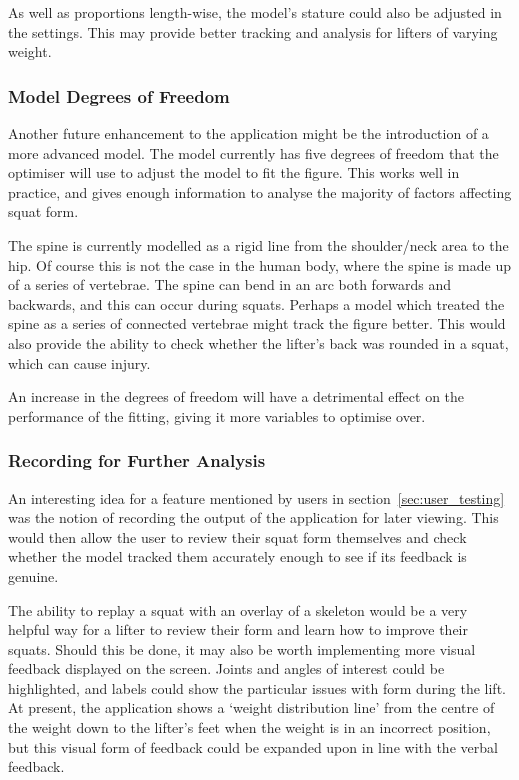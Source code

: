 As well as proportions length-wise, the model's stature could also be adjusted in the settings. This may provide better tracking and analysis for lifters of varying weight.

\subsubsection{Model Degrees of Freedom}

Another future enhancement to the application might be the introduction of a more advanced model. The model currently has five degrees of freedom that the optimiser will use to adjust the model to fit the figure. This works well in practice, and gives enough information to analyse the majority of factors affecting squat form.

The spine is currently modelled as a rigid line from the shoulder/neck area to the hip. Of course this is not the case in the human body, where the spine is made up of a series of vertebrae. The spine can bend in an arc both forwards and backwards, and this can occur during squats. Perhaps a model which treated the spine as a series of connected vertebrae might track the figure better. This would also provide the ability to check whether the lifter's back was rounded in a squat, which can cause injury.

An increase in the degrees of freedom will have a detrimental effect on the performance of the fitting, giving it more variables to optimise over.

\subsubsection{Recording for Further Analysis}

An interesting idea for a feature mentioned by users in section~\ref{sec:user_testing} was the notion of recording the output of the application for later viewing. This would then allow the user to review their squat form themselves and check whether the model tracked them accurately enough to see if its feedback is genuine.

The ability to replay a squat with an overlay of a skeleton would be a very helpful way for a lifter to review their form and learn how to improve their squats. Should this be done, it may also be worth implementing more visual feedback displayed on the screen. Joints and angles of interest could be highlighted, and labels could show the particular issues with form during the lift. At present, the application shows a `weight distribution line' from the centre of the weight down to the lifter's feet when the weight is in an incorrect position, but this visual form of feedback could be expanded upon in line with the verbal feedback.


